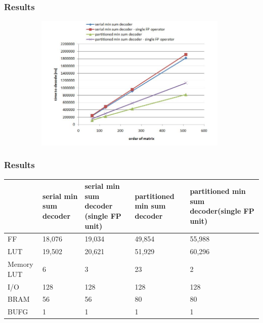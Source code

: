 \documentclass[xcolor=dvipsname]
{beamer}
\begin{document}
\begin{frame}[t]
\vspace{-0.5cm} 
\frametitle{Results  }  
\begin{figure}
       \includegraphics[height=6.5cm,width=11cm]{parallel_result2}
       \end{figure}
\end{frame}
\begin{frame}[t]
\frametitle{Results} 
\begin{table}[]
\centering
\begin{tabular}{|p{1.3cm}|p{1.8cm}|p{1.8cm}|p{1.8cm}|p{1.8cm}|}
\hline
	& serial min sum decoder & serial min sum decoder \newline
	(single FP unit) & partitioned min sum decoder & partitioned min sum decoder(single FP unit) \\ \hline
FF & 18,076		&19,034		&49,854		&55,988 \\ \hline
LUT & 19,502  &20,621 &  51,929 & 60,296 \\ \hline
Memory LUT & 6 & 3 & 23 & 2 \\ \hline 
I/O & 128 & 128 & 128 & 128 \\ \hline
BRAM & 56 & 56 & 80 & 80 \\ \hline
BUFG  & 1 & 1 & 1 & 1 \\ \hline
\end{tabular}
\end{table}
\end{frame}
\end{document}

